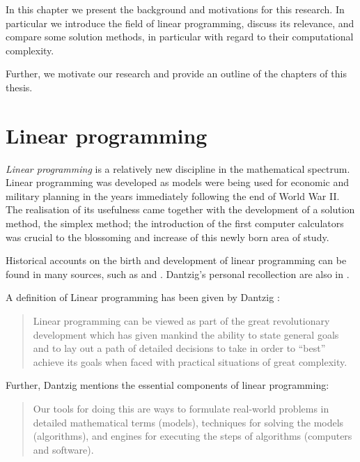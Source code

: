 
%
%
\label{ch:Introduction}

In this chapter we present the background and motivations for
this research. In particular we introduce the field of linear programming,
discuss its relevance, and compare some solution methods, in particular
with regard to their computational complexity.

Further, we motivate our research and provide an outline of the chapters
of this thesis.

%
%
\section{Linear programming}

{\em Linear programming} is a relatively new discipline in the mathematical
spectrum.
Linear programming was developed as models were being used for
economic and military planning in the years immediately following
the end of World War II.
The realisation of its usefulness came together with the development
of a solution method, the simplex method;
the introduction of the first computer calculators was crucial to
the blossoming and increase of this newly born area of study. 

Historical accounts on the birth and development of linear programming 
can be found in many sources, such as \cite[ch.~2]{Dantzig63} and 
\cite{Schrijver86}. Dantzig's personal recollection are also
in \cite{Dantzig02}.

A definition of Linear programming has been given by Dantzig \cite{Dantzig02}:
\begin{quote}
Linear programming can be viewed as part of the great revolutionary 
development which has given mankind the ability to state general goals
and to lay out a path of detailed decisions to take in order to ``best''
achieve its goals when faced with practical situations of great complexity.
\end{quote}

Further, Dantzig \cite{Dantzig02} mentions the essential 
components of linear programming:
\begin{quote}
Our tools for doing this are ways to formulate real-world problems in
detailed mathematical terms (models), techniques for solving the models
(algorithms), and engines for executing the steps of algorithms
(computers and software).
\end{quote}

